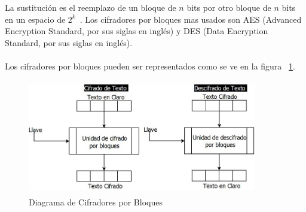La sustitución es el reemplazo de un bloque de $n$ bits por otro bloque de $n$ bits en un espacio de 
$2^{k}$~\cite{bloc}. Los cifradores por bloques mas usados son AES (Advanced Encryption Standard, por sus 
siglas en ingl\'es) y DES (Data Encryption Standard, por sus siglas en ingl\'es). ~\cite{bloques}\\ \\ 

Los cifradores por bloques pueden ser representados como se ve en la figura ~\ref{fig:2-5-1}.

\begin{figure}[H]
\centering
	\includegraphics[width=10cm, height=5cm]{./images/CifradoBloques.jpeg}
	\caption{Diagrama de Cifradores por Bloques}
	\label{fig:2-5-1}
\end{figure}






